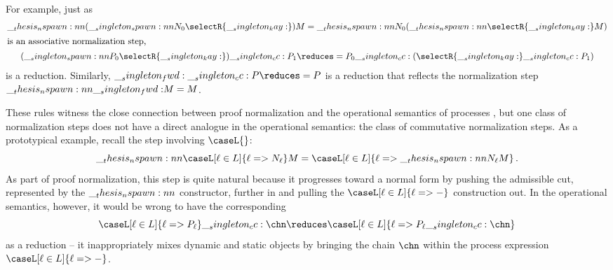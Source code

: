 For example, just as
\begin{gather*}
  \nspawn{(\spawn{N_0}{\selectR{\kay}})}{M} = \nspawn{N_0}{(\nspawn{\selectR{\kay}}{M})} \\
%
\intertext{is an associative normalization step,}
%
  (\spawn{P_0}{\selectR{\kay}}) \cc P_1
    \reduces %
    = P_0 \cc (\selectR{\kay} \cc P_1)
\end{gather*}
is a reduction.
Similarly, $\fwd \cc P \reduces= P$ is a reduction that reflects the normalization step $\nspawn{\fwd}{M} = M$.



These rules witness the close connection between proof normalization and the operational semantics of processes%
, but one class of normalization steps does not have a direct analogue in the operational semantics: the class of commutative normalization steps.
As a prototypical example, recall the step involving $\caseL{}$:
\begin{equation*}
  \nspawn{\caseL[\ell \in L]{\ell => N_{\ell}}}{M} = \caseL[\ell \in L]{\ell => \nspawn{N_{\ell}}{M}}
  \,.
\end{equation*}
As part of proof normalization, this step is quite natural because it progresses toward a normal form by pushing the admissible cut, represented by the $\nspawn{}{}$ constructor, further in and pulling the $\caseL[\ell \in L]{\ell => {-}}$ construction out.
In the operational semantics, however, it would be wrong to have the corresponding
\begin{equation*}
  \caseL[\ell \in L]{\ell => P_{\ell}} \cc \chn \reduces \caseL[\ell \in L]{\ell => P_{\ell} \cc \chn}
\end{equation*}
as a reduction -- it inappropriately mixes dynamic and static objects by bringing the chain $\chn$ within the process expression $\caseL[\ell \in L]{\ell => {-}}$.

